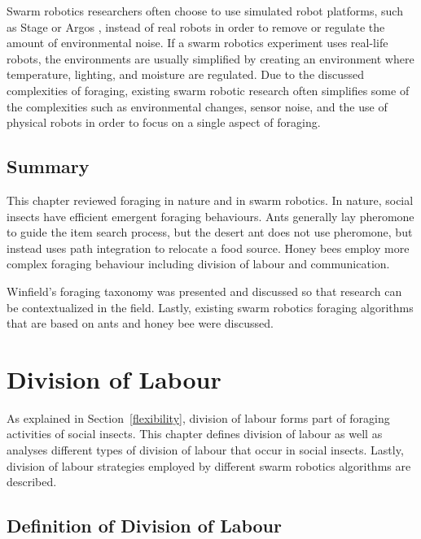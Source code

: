 Swarm robotics researchers often choose to use simulated robot platforms, such as Stage \cite{vaughan2008massively} or Argos \cite{pinciroli2011argos}, instead of real robots in order to remove or regulate the amount of environmental noise. If a swarm robotics experiment uses real-life robots, the environments are usually simplified by creating an environment where temperature, lighting, and moisture are regulated\cite{labella2006division,nouyan2006group}. Due to the discussed complexities of foraging, existing swarm robotic research often simplifies some of the complexities such as environmental changes, sensor noise, and the use of physical robots in order to focus on a single aspect of foraging. 

\section{Summary}
\label{foraging:summary}

This chapter reviewed foraging in nature and in swarm robotics. In nature, social insects have efficient emergent foraging behaviours. Ants generally lay pheromone to guide the item search process, but the desert ant does not use pheromone, but instead uses path integration to relocate a food source. Honey bees employ more complex foraging behaviour including division of labour and communication. 

Winfield's foraging taxonomy was presented and discussed so that research can be contextualized in the field. Lastly, existing swarm robotics foraging algorithms that are based on ants and honey bee were discussed.

\chapter{Division of Labour}
\label{chap:divisionoflabour}


As explained in Section~\ref{flexibility}, division of labour forms part of foraging activities of social insects. This chapter defines division of labour as well as analyses different types of division of labour that occur in social insects. Lastly, division of labour strategies employed by different swarm robotics algorithms are described. 

\section{Definition of Division of Labour}
\label{division:definition}

